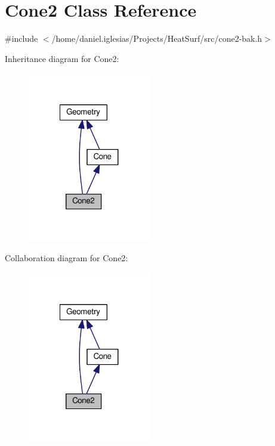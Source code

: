 \hypertarget{classCone2}{\section{Cone2 Class Reference}
\label{classCone2}
}


{\ttfamily \#include $<$/home/daniel.\-iglesias/\-Projects/\-Heat\-Surf/src/cone2-\/bak.\-h$>$}



Inheritance diagram for Cone2\-:\nopagebreak
\begin{figure}[H]
\begin{center}
\leavevmode
\includegraphics[width=152pt]{classCone2__inherit__graph}
\end{center}
\end{figure}


Collaboration diagram for Cone2\-:\nopagebreak
\begin{figure}[H]
\begin{center}
\leavevmode
\includegraphics[width=152pt]{classCone2__coll__graph}
\end{center}
\end{figure}

